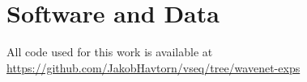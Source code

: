 


\maketitle






\section*{Software and Data}
All code used for this work is available at \url{https://github.com/JakobHavtorn/vseq/tree/wavenet-exps}
\clearpage
\appendix




